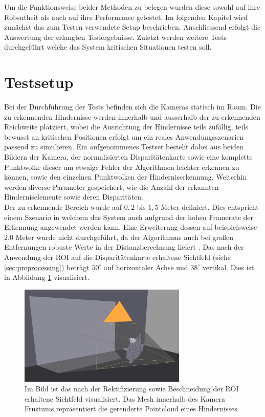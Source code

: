 Um die Funktionsweise beider Methoden zu belegen wurden diese sowohl auf ihre Robsutheit als auch auf ihre Performance getestet. Im folgenden Kapitel wird zunächst das zum Testen verwendete Setup beschrieben. Anschliessend erfolgt die Auswertung der erlangten Testergebnisse. Zuletzt werden weitere Tests durchgeführt welche das System kritischen Situationen testen soll.

\section{Testsetup}
\label{sec:test_setup}

Bei der Durchführung der Tests befinden sich die Kameras statisch im Raum. Die zu erkennenden Hindernisse werden innerhalb und ausserhalb der zu erkennenden Reichweite platziert, wobei die Ausrichtung der Hindernisse teils zufällig, teils bewusst an kritischen Positionen erfolgt um ein reales Anwendungsszenarien passend zu simulieren. Ein aufgenommenes Testset besteht dabei aus beiden Bildern der Kamera, der normalisierten Disparitätenkarte sowie eine komplette Punktwolke dieser um etwaige Fehler der Algorithmen leichter erkennen zu können, sowie den einzelnen Punktwolken der Hinderniserkennung. Weiterhin werden diverse Parameter gespeichert, wie die Anzahl der erkannten Hinderniselemente sowie deren Disparitäten.\\

\noindent
Der zu erkennende Bereich wurde auf $0,2$ bis $1,5$ Meter definiert. Dies entspricht einem Szenario in welchem das System auch aufgrund der hohen Framerate der Erkennung angewendet werden kann. Eine Erweiterung dessen auf beispielsweise $2.0$ Meter wurde nicht durchgeführt, da der Algorithmus auch bei großen Entfernungen robuste Werte in der Distanzberechnung liefert \cite{hilleralhallak}. Das nach der Anwendung der ROI auf die Disparitätenkarte erhaltene Sichtfeld (siehe \ref{sec:preprocessing}) beträgt $50^{\circ}$ auf horizontaler Achse und $38^{\circ}$ vertikal. Dies ist in Abbildung \ref{fig:field_of_view} visualisiert.
	
	\begin{figure}
		\centering
		\includegraphics[width=8cm]{img/viewport}
		\caption{Im Bild ist das nach der Rektifizierung sowie Beschneidung der ROI erhaltene Sichtfeld visualisiert. Das Mesh innerhalb des Kamera Frustums repräsentiert die gerenderte Pointcloud eines Hindernisses}
		\label{fig:field_of_view}
	\end{figure}

